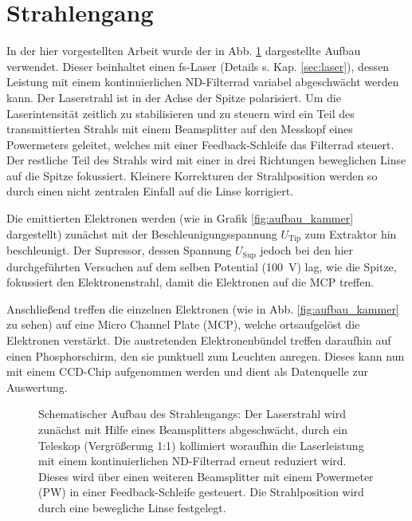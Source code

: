 \documentclass[bachelor,       %
               twoside,        %
               BCOR10mm,       %
               english,ngerman, %
               ]{GAUBM}
\begin{document}
\section{Strahlengang}
In der hier vorgestellten Arbeit wurde der in Abb. \ref{fig:aufbau} dargestellte Aufbau verwendet.
Dieser beinhaltet einen fs-Laser (Details s. Kap. \ref{sec:laser}), dessen Leistung mit einem kontinuierlichen ND-Filterrad variabel abgeschwächt werden kann.
Der Laserstrahl ist in der Achse der Spitze polarisiert.
Um die Laserintensität zeitlich zu stabilisieren und zu steuern wird ein Teil des transmittierten Strahls mit einem Beamsplitter auf den Messkopf eines Powermeters geleitet, welches mit einer Feedback-Schleife das Filterrad steuert.
Der restliche Teil des Strahls wird mit einer in drei Richtungen beweglichen Linse auf die Spitze fokussiert.
Kleinere Korrekturen der Strahlposition werden so durch einen nicht zentralen Einfall auf die Linse korrigiert.


Die emittierten Elektronen werden (wie in Grafik \ref{fig:aufbau_kammer} dargestellt) zunächst mit der Beschleunigungsspannung $U_\text{Tip}$ zum Extraktor hin beschleunigt.
Der Supressor, dessen Spannung $U_\text{Sup}$ jedoch bei den hier durchgeführten Versuchen auf dem selben Potential (\SI{100}{\V}) lag, wie die Spitze, fokussiert den Elektronenstrahl, damit die Elektronen auf die MCP treffen.\newline

Anschließend treffen die einzelnen Elektronen (wie in Abb. \ref{fig:aufbau_kammer} zu sehen) auf eine Micro Channel Plate (MCP), welche ortsaufgelöst die Elektronen verstärkt.
Die austretenden Elektronenbündel treffen daraufhin auf einen Phosphorschirm, den sie punktuell zum Leuchten anregen.
Dieses kann nun mit einem CCD-Chip aufgenommen werden und dient als Datenquelle zur Auswertung.


\begin{figure}[h!]
	\centering
	\def\svgwidth{0.7\textwidth}
	
	\caption{Schematischer Aufbau des Strahlengangs: Der Laserstrahl wird zunächst mit Hilfe eines Beamsplitters abgeschwächt, durch ein Teleskop (Vergrößerung 1:1)  kollimiert woraufhin die Laserleistung mit einem kontinuierlichen ND-Filterrad erneut reduziert wird. Dieses wird über einen weiteren Beamsplitter mit einem Powermeter (PW) in einer Feedback-Schleife gesteuert. Die Strahlposition wird durch eine bewegliche Linse festgelegt.}
	\label{fig:aufbau}
\end{figure}
\end{document}
